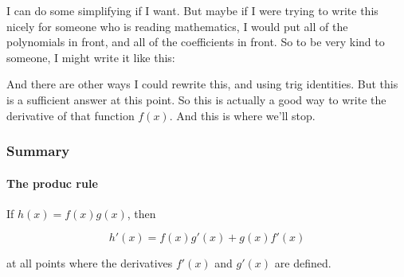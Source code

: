 \documentclass[pdftex, brazil, 12pt, twoside]{article}
\begin{document}
I can do some simplifying if I want.
But maybe if I were trying to write this nicely
for someone who is reading mathematics,
I would put all of the polynomials in front,
and all of the coefficients in front.
So to be very kind to someone, I might write it like this:

\begin{figure}[H]
  \begin{center}
  \end{center}
\end{figure}

And there are other ways I could rewrite this,
and using trig identities.
But this is a sufficient answer at this point.
So this is actually a good way to write
the derivative of that function $f(x)$.
And this is where we'll stop.

\subsubsection{Summary}
\label{u2-product-rule-summary}

\paragraph{The produc rule}
If $h(x) = f(x)g(x)$, then

\begin{equation*}
  h'(x) = f(x)g'(x) + g(x)f'(x)
\end{equation*}

at all points where the derivatives $f'(x)$ and $g'(x)$ are defined.
\end{document}
